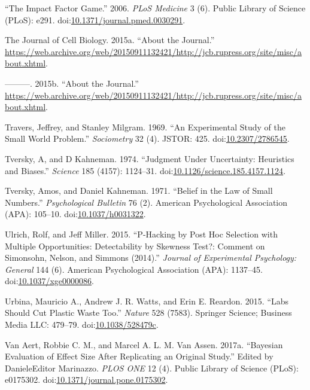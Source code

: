 \documentclass[a5paper]{book}
\begin{document}
\hypertarget{ref-doi:10.1371ux2fjournal.pmed.0030291}{}
``The Impact Factor Game.'' 2006. \emph{PLoS Medicine} 3 (6). Public
Library of Science (PLoS): e291.
doi:\href{https://doi.org/10.1371/journal.pmed.0030291}{10.1371/journal.pmed.0030291}.

\hypertarget{ref-cellbio2015}{}
The Journal of Cell Biology. 2015a. ``About the Journal.''
\url{https://web.archive.org/web/20150911132421/http://jcb.rupress.org/site/misc/about.xhtml}.

\hypertarget{ref-The_Journal_of_Cell_Biology2015-vh}{}
---------. 2015b. ``About the Journal.''
\url{https://web.archive.org/web/20150911132421/http://jcb.rupress.org/site/misc/about.xhtml}.

\hypertarget{ref-doi:10.2307ux2f2786545}{}
Travers, Jeffrey, and Stanley Milgram. 1969. ``An Experimental Study of
the Small World Problem.'' \emph{Sociometry} 32 (4). JSTOR: 425.
doi:\href{https://doi.org/10.2307/2786545}{10.2307/2786545}.

\hypertarget{ref-doi:10.1126ux2fscience.185.4157.1124}{}
Tversky, A, and D Kahneman. 1974. ``Judgment Under Uncertainty:
Heuristics and Biases.'' \emph{Science} 185 (4157): 1124--31.
doi:\href{https://doi.org/10.1126/science.185.4157.1124}{10.1126/science.185.4157.1124}.

\hypertarget{ref-doi:10.1037ux2fh0031322}{}
Tversky, Amos, and Daniel Kahneman. 1971. ``Belief in the Law of Small
Numbers.'' \emph{Psychological Bulletin} 76 (2). American Psychological
Association (APA): 105--10.
doi:\href{https://doi.org/10.1037/h0031322}{10.1037/h0031322}.

\hypertarget{ref-doi:10.1037ux2fxge0000086}{}
Ulrich, Rolf, and Jeff Miller. 2015. ``P-Hacking by Post Hoc Selection
with Multiple Opportunities: Detectability by Skewness Test?: Comment on
Simonsohn, Nelson, and Simmons (2014).'' \emph{Journal of Experimental
Psychology: General} 144 (6). American Psychological Association (APA):
1137--45.
doi:\href{https://doi.org/10.1037/xge0000086}{10.1037/xge0000086}.

\hypertarget{ref-doi:10.1038ux2f528479c}{}
Urbina, Mauricio A., Andrew J. R. Watts, and Erin E. Reardon. 2015.
``Labs Should Cut Plastic Waste Too.'' \emph{Nature} 528 (7583).
Springer Science; Business Media LLC: 479--79.
doi:\href{https://doi.org/10.1038/528479c}{10.1038/528479c}.

\hypertarget{ref-doi:10.1371ux2fjournal.pone.0175302}{}
Van Aert, Robbie C. M., and Marcel A. L. M. Van Assen. 2017a. ``Bayesian
Evaluation of Effect Size After Replicating an Original Study.'' Edited
by DanieleEditor Marinazzo. \emph{PLOS ONE} 12 (4). Public Library of
Science (PLoS): e0175302.
doi:\href{https://doi.org/10.1371/journal.pone.0175302}{10.1371/journal.pone.0175302}.
\end{document}
